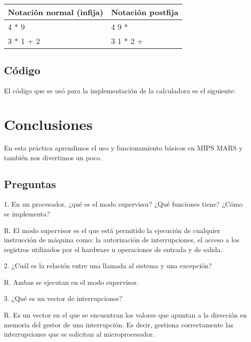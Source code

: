 \documentclass[12pt, letterpaper]{article}
\begin{document}
    \begin{table}
      \centering
      \begin{tabular}{ll}
          Notación normal (infija) & Notación postfija \\ \hline
               4 * 9                    & 4 9 *             \\
            3 * 1 + 2                & 3 1 * 2 +         \\
      \end{tabular}
    \end{table}\vspace{.2cm}

    \subsection*{Código}
    El código que se usó para la implementación de la calculadora es el siguiente:\vspace{.2cm}

    \vspace{.3cm}

    \section{Conclusiones}
    En esta práctica aprendimos el uso y funcionamiento básicos en MIPS MARS y
    también nos divertimos un poco.

    \subsection*{Preguntas}

    \begin{item}
      \item 1. En un procesador, ¿qué es el modo supervisor? ¿Qué funciones
                tiene? ¿Cómo se implementa?

                R. El modo supervisor es el que está permitido la ejecución de
                  cualquier instrucción de máquina como: la autorización de
                  interrupciones, el acceso a los registros utilizados por el
                  hardware u operaciones de entrada y de salida.

      \item 2. ¿Cuál es la relación entre una llamada al sistema y una excepción?

                R. Ambas se ejecutan en el modo supervisor.

      \item 3. ¿Qué es un vector de interrupciones?

                R. Es un vector en el que se encuentran los valores que apuntan
                   a la dirección en memoria del gestor de una interrupción. Es decir,
                   gestiona correctamente las interrupciones que se solicitan al
                   microprocesador.
    \end{item}

  
\end{document}
